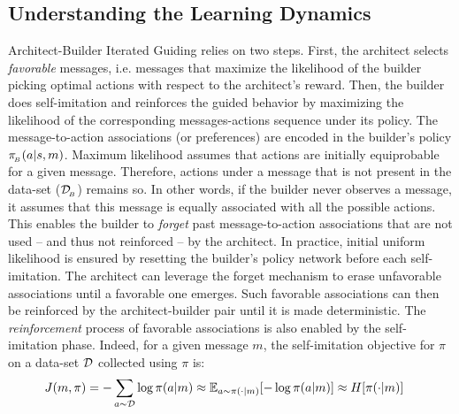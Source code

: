 \subsection{Understanding the Learning Dynamics}
\label{sec:intuition}
Architect-Builder Iterated Guiding relies on two steps. First, the architect selects \emph{favorable} messages, i.e. messages that maximize the likelihood of the builder picking optimal actions with respect to the architect's reward. Then, the builder does self-imitation and reinforces the guided behavior by maximizing the likelihood of the corresponding messages-actions sequence under its policy. The message-to-action associations (or preferences) are encoded in the builder's policy $\pi_{\!_B}(a|s,m)$. Maximum likelihood assumes that actions are initially equiprobable for a given message. Therefore, actions under a message that is not present in the data-set ($\mathcal{D}_{\!_B}$) remains so. In other words, if the builder never observes a message, it assumes that this message is equally associated with all the possible actions. This enables the builder to \emph{forget} past message-to-action associations that are not used -- and thus not reinforced -- by the architect. In practice, initial uniform likelihood is ensured by resetting the builder's policy network before each self-imitation. The architect can leverage the forget mechanism to erase unfavorable associations until a favorable one emerges. Such favorable associations can then be reinforced by the architect-builder pair until it is made deterministic. The \emph{reinforcement} process of favorable associations is also enabled by the self-imitation phase. Indeed, for a given message $m$, the self-imitation objective for $\pi$ on a data-set ${\mathcal{D}}$ collected using $\pi$ is: 
\begin{equation}
\begin{aligned}
    J(m, \pi) &= -\sum_{a\sim \mathcal{D}} \log\pi(a|m)\approx \mathbb{E}_{a\sim\pi(\cdot|m)}[-\log\pi(a|m)]\approx H[\pi(\cdot|m)]
    \label{eq:bc_entropy}
\end{aligned}
\end{equation}
